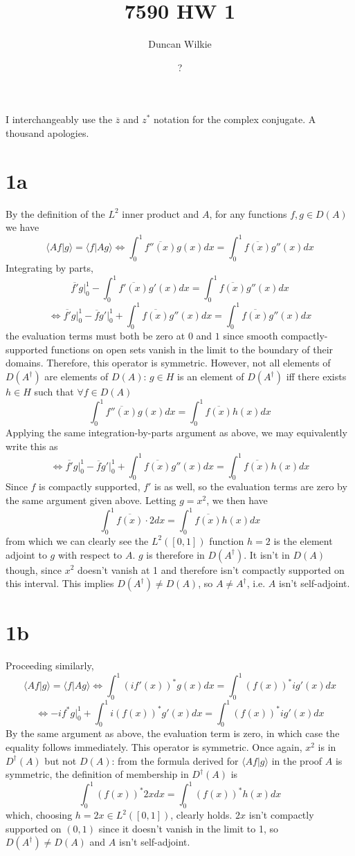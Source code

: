 \documentclass{article}
\title{7590 HW 1}
\author{Duncan Wilkie}
\date{?}
\begin{document}
\maketitle

I interchangeably use the $\overline{z}$ and $z^{*}$ notation for the complex conjugate.
A thousand apologies.
\section*{1a}
By the definition of the $L^2$ inner product and $A$, for any functions $f,g\in D(A)$ we have
\[\langle Af|g \rangle=\langle f|Ag \rangle\Leftrightarrow \int_0^1\overline{f''(x)}g(x)dx=\int_0^1\overline{f(x)}g''(x)dx \]
Integrating by parts,
\[\overline{f'}g\bigg|_0^1-\int_0^1\overline{f'(x)}g'(x)dx=\int_0^1\overline{f(x)}g''(x)dx\]
\[\Leftrightarrow \overline{f'}g\bigg|_0^1-\overline{f}g'\bigg|_0^1+\int_0^1\overline{f(x)}g''(x)dx=\int_0^1\overline{f(x)}g''(x)dx\]
the evaluation terms  must both be zero at $0$ and $1$ since smooth compactly-supported functions on open sets vanish
in the limit to the boundary of their domains. %
Therefore, this operator is symmetric.
However, not all elements of $D(A^{\dagger})$ are elements of $D(A)$: $g\in H$ is an element of $D(A^{\dagger})$ iff there exists
$h\in H$ such that $\forall f\in D(A)$
\[
  \int_{0}^{1}\overline{f''(x)}g(x)dx=\int_{0}^{1}\overline{f(x)}h(x)dx
\]
Applying the same integration-by-parts argument as above, we may equivalently write this as
\[\Leftrightarrow \overline{f'}g\bigg|_0^1-\overline{f}g'\bigg|_0^1+\int_0^1\overline{f(x)}g''(x)dx=\int_0^1\overline{f(x)}h(x)dx\]
Since $f$ is compactly supported, $f'$ is as well, so the evaluation terms are zero by the same argument given above.
Letting $g=x^{2}$, we then have
\[\int_{0}^{1}\overline{f(x)}\cdot 2dx=\int_{0}^{1}\overline{f(x)}h(x)dx\]
from which we can clearly see the $L^{2}([0,1])$ function $h=2$ is the element adjoint to $g$ with respect to $A$.
$g$ is therefore in $D(A^{\dagger})$.
It isn't in $D(A)$ though, since $x^{2}$ doesn't vanish at 1 and therefore isn't compactly supported on this interval.
This implies $D(A^{\dagger})\neq D(A)$, so $A\neq A^{\dagger}$, i.e. $A$ isn't self-adjoint.

\section*{1b}
Proceeding similarly,
\[
  \langle Af|g \rangle=\langle f|Ag \rangle
  \Leftrightarrow \int_{0}^{1}(if'(x))^{*}g(x)dx=\int_{0}^{1}(f(x))^{*}ig'(x)dx
\]
\[
  \Leftrightarrow -if^{*}g\bigg|_{0}^{1}+\int_{0}^{1}i(f(x))^{*}g'(x)dx=\int_{0}^{1}(f(x))^{*}ig'(x)dx
\]
By the same argument as above, the evaluation term is zero, in which case the equality follows immediately.
This operator is symmetric.
Once again, $x^{2}$ is in $D^{\dagger}(A)$ but not $D(A)$: from the formula derived for $\langle Af|g \rangle$ in the proof $A$ is symmetric,
the definition of membership in $D^{\dagger}(A)$ is
\[\int_{0}^{1}(f(x))^{*}2xdx=\int_{0}^{1}(f(x))^{*}h(x)dx\]
which, choosing $h=2x\in L^{2}([0,1])$, clearly holds.
$2x$ isn't compactly supported on $(0,1)$ since it doesn't vanish in the limit to 1, so $D(A^{\dagger})\neq D(A)$ and $A$ isn't self-adjoint.
\end{document}
